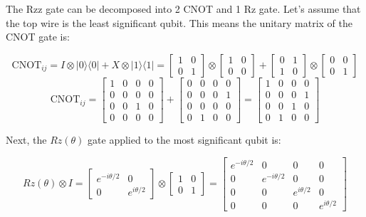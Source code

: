 \documentclass[12pt,a4paper]{report}
\begin{document}
\noindent
The Rzz gate can be decomposed into 2 CNOT and 1 Rz gate. Let's assume that the top wire is the least significant qubit. This means the unitary matrix of the CNOT gate is:

\[
\text{CNOT}_{ij} = I \otimes |0\rangle\langle0| + X \otimes |1\rangle\langle1| = \begin{bmatrix} 1 & 0 \\ 0 & 1 \end{bmatrix} \otimes \begin{bmatrix} 1 & 0 \\ 0 & 0 \end{bmatrix} + \begin{bmatrix} 0 & 1 \\ 1 & 0 \end{bmatrix} \otimes \begin{bmatrix} 0 & 0 \\ 0 & 1 \end{bmatrix}
\]
\[
\text{CNOT}_{ij} = \begin{bmatrix} 1 & 0 & 0 & 0 \\ 0 & 0 & 0 & 0 \\ 0 & 0 & 1 & 0 \\ 0 & 0 & 0 & 0 \end{bmatrix} + \begin{bmatrix} 0 & 0 & 0 & 0 \\ 0 & 0 & 0 & 1 \\ 0 & 0 & 0 & 0 \\ 0 & 1 & 0 & 0 \end{bmatrix} = \begin{bmatrix} 1 & 0 & 0 & 0 \\ 0 & 0 & 0 & 1 \\ 0 & 0 & 1 & 0 \\ 0 & 1 & 0 & 0 \end{bmatrix}
\]

\newpage
\noindent
Next, the \( Rz(\theta) \) gate applied to the most significant qubit is:

\[
Rz(\theta) \otimes I = \begin{bmatrix} e^{-i\theta/2} & 0 \\ 0 & e^{i\theta/2} \end{bmatrix} \otimes \begin{bmatrix} 1 & 0 \\ 0 & 1 \end{bmatrix} = \begin{bmatrix} e^{-i\theta/2} & 0 & 0 & 0 \\ 0 & e^{-i\theta/2} & 0 & 0 \\ 0 & 0 & e^{i\theta/2} & 0 \\ 0 & 0 & 0 & e^{i\theta/2} \end{bmatrix}
\]
\end{document}
